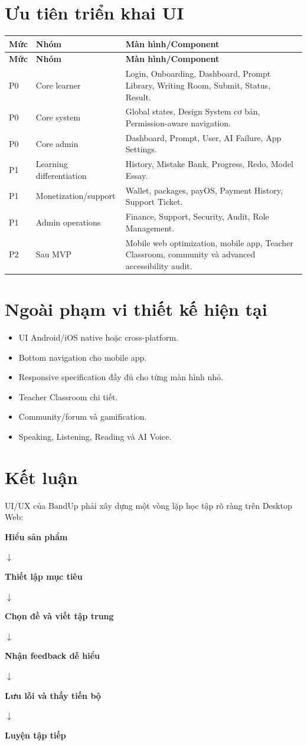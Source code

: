 \documentclass[11pt,a4paper]{article}
\newcommand{\flowarrow}{\par\centering\sffamily\color{BandBlue}\Large$\downarrow$\par}
\newcommand{\flowstep}[1]{\par\centering\sffamily\bfseries #1\par}
\begin{document}
\section{Ưu tiên triển khai UI}
\small
\begin{longtable}{|P{0.12\textwidth}|P{0.28\textwidth}|P{0.50\textwidth}|}
\hline
\textbf{Mức} & \textbf{Nhóm} & \textbf{Màn hình/Component} \\ \hline
\endfirsthead
\hline
\textbf{Mức} & \textbf{Nhóm} & \textbf{Màn hình/Component} \\ \hline
\endhead
P0 & Core learner & Login, Onboarding, Dashboard, Prompt Library, Writing Room, Submit, Status, Result. \\ \hline
P0 & Core system & Global states, Design System cơ bản, Permission-aware navigation. \\ \hline
P0 & Core admin & Dashboard, Prompt, User, AI Failure, App Settings. \\ \hline
P1 & Learning differentiation & History, Mistake Bank, Progress, Redo, Model Essay. \\ \hline
P1 & Monetization/support & Wallet, packages, payOS, Payment History, Support Ticket. \\ \hline
P1 & Admin operations & Finance, Support, Security, Audit, Role Management. \\ \hline
P2 & Sau MVP & Mobile web optimization, mobile app, Teacher Classroom, community và advanced accessibility audit. \\ \hline
\end{longtable}
\normalsize

\section{Ngoài phạm vi thiết kế hiện tại}
\begin{itemize}
  \item UI Android/iOS native hoặc cross-platform.
  \item Bottom navigation cho mobile app.
  \item Responsive specification đầy đủ cho từng màn hình nhỏ.
  \item Teacher Classroom chi tiết.
  \item Community/forum và gamification.
  \item Speaking, Listening, Reading và AI Voice.
\end{itemize}

\section{Kết luận}
UI/UX của BandUp phải xây dựng một vòng lặp học tập rõ ràng trên Desktop Web:
\begin{flowbox}
\flowstep{Hiểu sản phẩm}
\flowarrow
\flowstep{Thiết lập mục tiêu}
\flowarrow
\flowstep{Chọn đề và viết tập trung}
\flowarrow
\flowstep{Nhận feedback dễ hiểu}
\flowarrow
\flowstep{Lưu lỗi và thấy tiến bộ}
\flowarrow
\flowstep{Luyện tập tiếp}
\end{flowbox}
\end{document}
